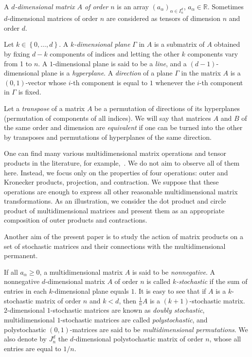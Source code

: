 \documentclass[a4paper]{article}
\begin{document}
A \textit{$d$-dimensional matrix $A$ of order $n$} is an array $(a_\alpha)_{\alpha \in I^d_n}$, $a_\alpha \in\mathbb R$.   Sometimes $d$-dimensional matrices of order $n$ are considered as tensors of dimension $n$ and order $d$. 

Let $k\in \left\{0,\ldots,d\right\}$. A \textit{$k$-dimensional plane} $\Gamma$ in $A$ is a submatrix of $A$ obtained by fixing $d-k$ components of indices and letting the other $k$ components vary from 1 to $n$. A $1$-dimensional plane is said to be a \textit{line}, and a $(d-1)$-dimensional plane is a \textit{hyperplane}. A \textit{direction} of  a plane $\Gamma$ in the matrix $A$ is a $(0,1)$-vector whose $i$-th component is equal to $1$ whenever the $i$-th component in $\Gamma$ is fixed. 

Let a \textit{transpose} of a matrix $A$ be a permutation of directions of its hyperplanes (permutation of components of all indices). 
We will say that matrices $A$ and $B$ of the same order and dimension are \textit{equivalent} if one can be turned into the other by transposes and  permutations of hyperplanes of the same direction.

One can find many various multidimensional matrix operations and tensor products in the literature, for example,~\cite{CheCveWei.tesorfunc, KilMar.facttensor, shao.tensprod, YaoLiuBu.tensorprod}. We do not aim to observe all of them here. Instead, we focus only on the  properties of four operations: outer and Kronecker products, projection, and contraction. We suppose that these operations  are enough to express all other reasonable multidimensional matrix transformations. As an illustration, we consider the dot product and circle product of multidimensional matrices and present them as an appropriate composition of outer products and contractions. 

Another aim of the present paper is to study the action of matrix products on a set of stochastic matrices and their connections with the multidimensional permanent.

If all $a_\alpha  \geq 0$, a multidimensional matrix $A$ is said to be \textit{nonnegative}.  
A nonnegative $d$-dimensional matrix $A$ of order $n$ is called \textit{$k$-stochastic} if  the sum of entries in each $k$-dimensional plane equals $1$. It is easy to see that if $A$ is a $k$-stochastic matrix of order $n$ and $k < d$, then $\frac{1}{n} A$ is a $(k+1)$-stochastic matrix.  $2$-dimensional $1$-stochastic matrices are known as \textit{doubly stochastic},  multidimensional $1$-stochastic matrices are called \textit{polystochastic}, and polystochastic $(0,1)$-matrices are said to be \textit{multidimensional permutations}. We also denote by $J_n^d$ the $d$-dimensional polystochastic matrix of order $n$, whose all entries are equal to $1/n$. 
\end{document}
